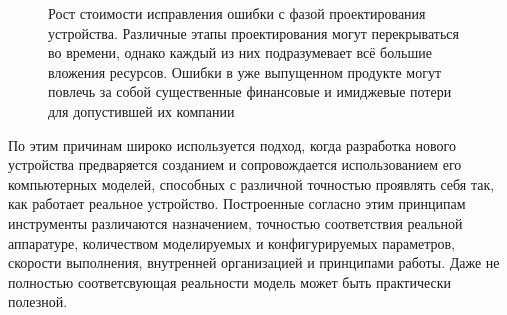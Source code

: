\begin{figure}[htb]
    \centering

    \caption[Рост стоимости исправления ошибки с фазой проектирования устройства]{Рост стоимости исправления ошибки с фазой проектирования устройства. Различные этапы проектирования могут перекрываться во времени, однако каждый из них подразумевает всё большие вложения ресурсов. Ошибки в уже выпущенном продукте могут повлечь за собой существенные финансовые и имиджевые потери для допустившей их компании}
    \label{fig:error-cost}
\end{figure}

По этим причинам широко используется подход, когда разработка нового устройства предваряется созданием и сопровождается использованием его компьютерных моделей, способных с различной точностью проявлять себя так, как работает реальное устройство. Построенные согласно этим принципам инструменты различаются назначением, точностью соответствия реальной аппаратуре, количеством моделируемых и конфигурируемых параметров, скорости выполнения, внутренней организацией и принципами работы. Даже не полностью соответсвующая реальности модель может быть практически полезной.

